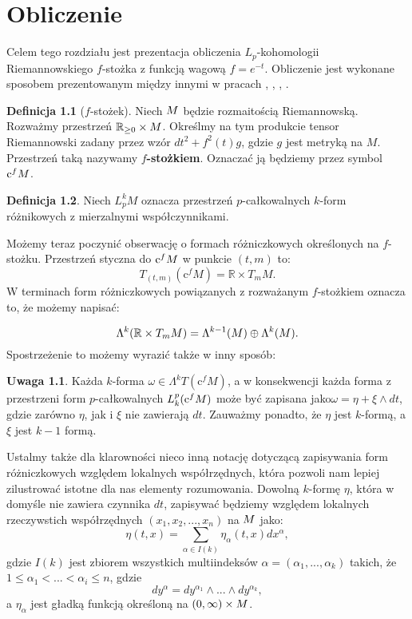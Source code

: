 \documentclass[licencjacka]{pracamgr}
\theoremstyle{definition}
\newtheorem{definition}{Definicja}[section]
\theoremstyle{definition}
\newtheorem{remark}{Uwaga}[section]
\theoremstyle{plain}
\theoremstyle{plain}
\def\cfm{\ensuremath\mathrm{c}^fM}
\def\M{\ensuremath M}
\begin{document}
\chapter{Obliczenie}

Celem tego rozdziału jest prezentacja obliczenia 
$L_p$-kohomologii Riemannowskiego $f$-stożka z funkcją wagową $f = e^{-t}$.
Obliczenie jest wykonane sposobem prezentowanym między innymi w
pracach \cite{cheeger}, \cite{youssin}, \cite{kirwan}, \cite{weber}.

\begin{definition}[$f$-stożek]
    Niech $\M$ będzie rozmaitością Riemannowską. Rozważmy przestrzeń
    $\mathbb{R}_{\geq 0} \times \M$. Określmy na tym produkcie tensor
    Riemannowski zadany przez wzór $dt^2 + f^{2}(t)g $, gdzie $g$ jest
    metryką na $M$.  Przestrzeń taką nazywamy \textbf{$f$-stożkiem}.
    Oznaczać ją będziemy przez symbol $\cfm$.
\end{definition}

\begin{definition}
  Niech $L_p^k M$ oznacza przestrzeń $p$-całkowalnych 
  $k$-form różnikowych z mierzalnymi  współczynnikami.
\end{definition}



Możemy teraz poczynić obserwację o formach różniczkowych określonych na 
$f$-stożku. Przestrzeń styczna do $\cfm$ w punkcie $(t, m)$ to:
\[
    T_{(t, m)} (\mathrm{c}^f M) = \mathbb{R} \times T_m M.
\]
W terminach form różniczkowych powiązanych z rozważanym $f$-stożkiem oznacza to, 
że możemy napisać:

\[
\Lambda^k(\mathbb{R} \times T_m \M) = 
\Lambda^{k-1}(\M)  \oplus \Lambda^k(\M).
\]
Spostrzeżenie to możemy wyrazić także w inny sposób: 

\begin{remark}
Każda $k$-forma $\omega \in \Lambda^k T(\mathrm{c}^f M)$, 
a w konsekwencji każda forma z przestrzeni form $p$-całkowalnych  $L_k^p
(\cfm)$ może być zapisana jako$\omega = \eta + \xi \wedge dt$,
gdzie zarówno $\eta$, jak i  $\xi$ nie zawierają $dt$.  Zauważmy ponadto,
że $\eta$ jest $k$-formą, a $\xi$ jest $k-1$ formą. \\
\end{remark}

Ustalmy także dla klarowności nieco inną notację dotyczącą zapisywania
form różniczkowych względem lokalnych współrzędnych, która pozwoli nam 
lepiej zilustrować istotne dla nas elementy rozumowania. Dowolną $k$-formę $\eta$,
która w domyśle nie zawiera czynnika $dt$, zapisywać będziemy względem
lokalnych rzeczywstich współrzędnych
$(x_1, x_2, ... , x_n)$ na $\M$ jako:
\[
    \eta(t, x) = \sum_{\alpha \in I(k)} \eta_\alpha (t, x) dx^\alpha,
\]
gdzie $I(k)$ jest zbiorem wszystkich multiindeksów $\alpha = (\alpha_1, ...,
\alpha_k)$ takich, że $1 \leq \alpha_1 < ... < \alpha_i \leq n$, gdzie
\begin{equation}\label{notacja}
    dy^\alpha = dy^{\alpha_1} \wedge ... \wedge dy^{\alpha_k},
\end{equation}
a $\eta_\alpha$ jest gładką funkcją określoną na $(0, \infty) \times \M$. \\
\end{document}
